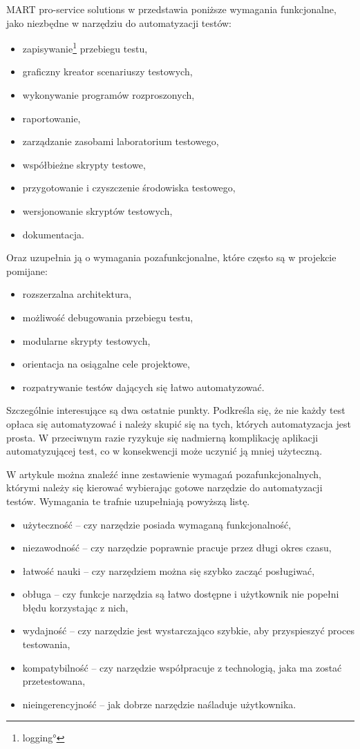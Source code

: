 \documentclass[00-praca-magisterska.tex]{subfiles}
\begin{document}
MART pro-service solutions w \cite{automation-fail} przedstawia poniższe
wymagania funkcjonalne, jako niezbędne w narzędziu do automatyzacji testów:
\begin{itemize}
\item zapisywanie\footnote{\ang{logging}} przebiegu testu,
\item graficzny kreator scenariuszy testowych,
\item wykonywanie programów rozproszonych,
\item raportowanie,
\item zarządzanie zasobami laboratorium testowego,
\item współbieżne skrypty testowe,
\item przygotowanie i czyszczenie środowiska testowego,
\item wersjonowanie skryptów testowych,
\item dokumentacja.
\end{itemize}

Oraz uzupełnia ją o wymagania pozafunkcjonalne, które często są w projekcie
pomijane:
\begin{itemize}
\item rozszerzalna architektura,
\item możliwość debugowania przebiegu testu,
\item modularne skrypty testowych,
\item orientacja na osiągalne cele projektowe,
\item rozpatrywanie testów dających się łatwo automatyzować.
\end{itemize}

Szczególnie interesujące są dwa ostatnie punkty. Podkreśla się, że nie każdy
test opłaca się automatyzować i należy skupić się na tych, których
automatyzacja jest prosta. W przeciwnym razie ryzykuje się nadmierną
komplikację aplikacji automatyzującej test, co w konsekwencji może uczynić ją
mniej użyteczną.

W artykule \cite{snake-oil} można znaleźć inne zestawienie wymagań
pozafunkcjonalnych, którymi należy się kierować wybierając gotowe narzędzie do
automatyzacji testów. Wymagania te trafnie uzupełniają powyższą listę.
\begin{itemize}
\item użyteczność -- czy narzędzie posiada wymaganą funkcjonalność,
\item niezawodność -- czy narzędzie poprawnie pracuje przez długi okres czasu,
\item łatwość nauki -- czy narzędziem można się szybko zacząć posługiwać,
\item obługa -- czy funkcje narzędzia są łatwo dostępne i użytkownik nie popełni błędu korzystając z nich,
\item wydajność -- czy narzędzie jest wystarczająco szybkie, aby przyspieszyć proces testowania,
\item kompatybilność -- czy narzędzie współpracuje z technologią, jaka ma zostać przetestowana,
\item nieingerencyjność -- jak dobrze narzędzie naśladuje użytkownika.
\end{itemize}
\end{document}
